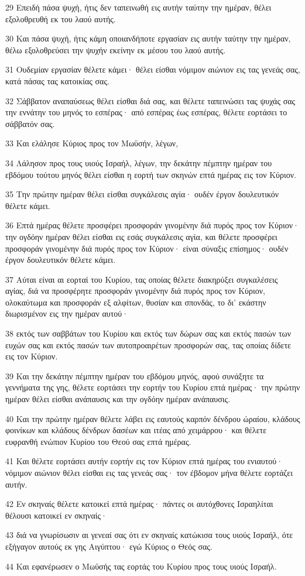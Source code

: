 \par 29 Επειδή πάσα ψυχή, ήτις δεν ταπεινωθή εις αυτήν ταύτην την ημέραν, θέλει εξολοθρευθή εκ του λαού αυτής.
\par 30 Και πάσα ψυχή, ήτις κάμη οποιανδήποτε εργασίαν εις αυτήν ταύτην την ημέραν, θέλω εξολοθρεύσει την ψυχήν εκείνην εκ μέσου του λαού αυτής.
\par 31 Ουδεμίαν εργασίαν θέλετε κάμει· θέλει είσθαι νόμιμον αιώνιον εις τας γενεάς σας, κατά πάσας τας κατοικίας σας.
\par 32 Σάββατον αναπαύσεως θέλει είσθαι διά σας, και θέλετε ταπεινώσει τας ψυχάς σας την εννάτην του μηνός το εσπέρας· από εσπέρας έως εσπέρας, θέλετε εορτάσει το σάββατόν σας.
\par 33 Και ελάλησε Κύριος προς τον Μωϋσήν, λέγων,
\par 34 Λάλησον προς τους υιούς Ισραήλ, λέγων, την δεκάτην πέμπτην ημέραν του εβδόμου τούτου μηνός θέλει είσθαι η εορτή των σκηνών επτά ημέρας εις τον Κύριον.
\par 35 Την πρώτην ημέραν θέλει είσθαι συγκάλεσις αγία· ουδέν έργον δουλευτικόν θέλετε κάμει.
\par 36 Επτά ημέρας θέλετε προσφέρει προσφοράν γινομένην διά πυρός προς τον Κύριον· την ογδόην ημέραν θέλει είσθαι εις εσάς συγκάλεσις αγία, και θέλετε προσφέρει προσφοράν γινομένην διά πυρός προς τον Κύριον· είναι σύναξις επίσημος· ουδέν έργον δουλευτικόν θέλετε κάμει.
\par 37 Αύται είναι αι εορταί του Κυρίου, τας οποίας θέλετε διακηρύξει συγκαλέσεις αγίας, διά να προσφέρητε προσφοράν γινομένην διά πυρός προς τον Κύριον, ολοκαύτωμα και προσφοράν εξ αλφίτων, θυσίαν και σπονδάς, το δι' εκάστην διωρισμένον εις την ημέραν αυτού·
\par 38 εκτός των σαββάτων του Κυρίου και εκτός των δώρων σας και εκτός πασών των ευχών σας και εκτός πασών των αυτοπροαιρέτων προσφορών σας, τας οποίας δίδετε εις τον Κύριον.
\par 39 Και την δεκάτην πέμπτην ημέραν του εβδόμου μηνός, αφού συνάξητε τα γεννήματα της γης, θέλετε εορτάσει την εορτήν του Κυρίου επτά ημέρας· την πρώτην ημέραν θέλει είσθαι ανάπαυσις και την ογδόην ημέραν ανάπαυσις.
\par 40 Και την πρώτην ημέραν θέλετε λάβει εις εαυτούς καρπόν δένδρου ώραίου, κλάδους φοινίκων και κλάδους δένδρων δασέων και ιτέας από χειμάρρου· και θέλετε ευφρανθή ενώπιον Κυρίου του Θεού σας επτά ημέρας.
\par 41 Και θέλετε εορτάσει αυτήν εορτήν εις τον Κύριον επτά ημέρας του ενιαυτού· νόμιμον αιώνιον θέλει είσθαι εις τας γενεάς σας· τον έβδομον μήνα θέλετε εορτάζει αυτήν.
\par 42 Εν σκηναίς θέλετε κατοικεί επτά ημέρας· πάντες οι αυτόχθονες Ισραηλίται θέλουσι κατοικεί εν σκηναίς·
\par 43 διά να γνωρίσωσιν αι γενεαί σας ότι εν σκηναίς κατώκισα τους υιούς Ισραήλ, ότε εξήγαγον αυτούς εκ γης Αιγύπτου· εγώ Κύριος ο Θεός σας.
\par 44 Και εφανέρωσεν ο Μωϋσής τας εορτάς του Κυρίου προς τους υιούς Ισραήλ.

